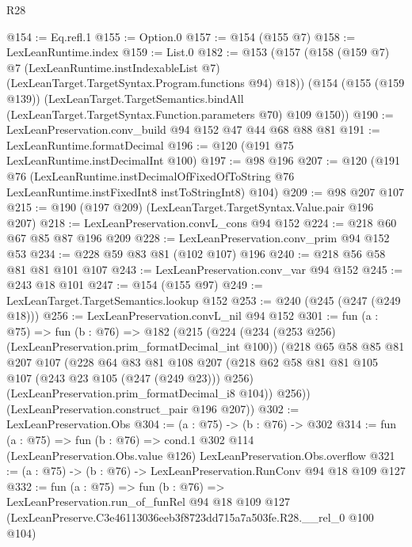 \begin{lexlean}{R28}
\begin{coremodule}
@154 := Eq.refl.{1}
@155 := Option.{0}
@157 := @154 (@155 @7)
@158 := LexLeanRuntime.index
@159 := List.{0}
@182 := @153
    (@157
      (@158
        (@159 @7)
        @7
        (LexLeanRuntime.instIndexableList @7)
        (LexLeanTarget.TargetSyntax.Program.functions @94)
        @18))
    (@154
      (@155 (@159 @139))
      (LexLeanTarget.TargetSemantics.bindAll
        (LexLeanTarget.TargetSyntax.Function.parameters @70)
        @109
        @150))
@190 := LexLeanPreservation.conv_build @94 @152 @47 @44 @68 @88 @81
@191 := LexLeanRuntime.formatDecimal
@196 := @120 (@191 @75 LexLeanRuntime.instDecimalInt @100)
@197 := @98 @196
@207 := @120
    (@191
      @76
      (LexLeanRuntime.instDecimalOfFixedOfToString
        @76
        LexLeanRuntime.instFixedInt8
        instToStringInt8)
      @104)
@209 := @98 @207 @107
@215 := @190 (@197 @209) (LexLeanTarget.TargetSyntax.Value.pair @196 @207)
@218 := LexLeanPreservation.convL_cons @94 @152
@224 := @218 @60 @67 @85 @87 @196 @209
@228 := LexLeanPreservation.conv_prim @94 @152 @53
@234 := @228 @59 @83 @81 (@102 @107) @196
@240 := @218 @56 @58 @81 @81 @101 @107
@243 := LexLeanPreservation.conv_var @94 @152
@245 := @243 @18 @101
@247 := @154 (@155 @97)
@249 := LexLeanTarget.TargetSemantics.lookup @152
@253 := @240 (@245 (@247 (@249 @18)))
@256 := LexLeanPreservation.convL_nil @94 @152
@301 := fun (a : @75) =>
  fun (b : @76) =>
  @182
    (@215
      (@224
        (@234 (@253 @256) (LexLeanPreservation.prim_formatDecimal_int @100))
        (@218
          @65
          @58
          @85
          @81
          @207
          @107
          (@228
            @64
            @83
            @81
            @108
            @207
            (@218 @62 @58 @81 @81 @105 @107 (@243 @23 @105 (@247 (@249 @23))) @256)
            (LexLeanPreservation.prim_formatDecimal_i8 @104))
          @256))
      (LexLeanPreservation.construct_pair @196 @207))
@302 := LexLeanPreservation.Obs
@304 := (a : @75) -> (b : @76) -> @302
@314 := fun (a : @75) =>
  fun (b : @76) =>
  cond.{1} @302 @114 (LexLeanPreservation.Obs.value @126) LexLeanPreservation.Obs.overflow
@321 := (a : @75) -> (b : @76) -> LexLeanPreservation.RunConv @94 @18 @109 @127
@332 := fun (a : @75) =>
  fun (b : @76) =>
  LexLeanPreservation.run_of_funRel
    @94
    @18
    @109
    @127
    (LexLeanPreserve.C3e46113036eeb3f8723dd715a7a503fe.R28.__rel_0 @100 @104)
\end{coremodule}
\end{lexlean}

